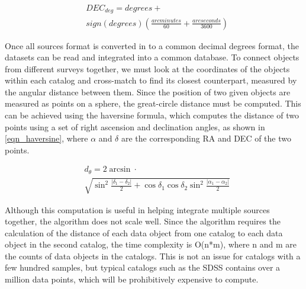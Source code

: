 \documentclass[11pt,sigconf]{acmart}
\begin{document}
\begin{equation} \label{eqn_dec}
  \begin{split}
  & DEC_{deg}= degrees+ \\
  & sign(degrees)(\frac{arcminutes}{60} + \frac{arcseconds}{3600})
  \end{split}
\end{equation}

Once all sources format is converted in to a common decimal degrees format, the 
datasets can be read and integrated into a common database. To connect objects 
from different surveys together, we must look at the coordinates of the
objects within each catalog and cross-match to find its closest counterpart, 
measured by the angular distance between them. Since the position of two given 
objects are measured as points on a sphere, the great-circle distance must be 
computed. This can be achieved using the haversine formula, which computes the 
distance of two points using a set of right ascension and declination angles, 
as shown in \ref{eqn_haversine}, where $\alpha$ and $\delta$ are the corresponding
RA and DEC of the two points.

\begin{equation} \label{eqn_haversine}
  \begin{split}
   & d_{\theta} = 2 \arcsin \cdot \\
   & {\sqrt{\sin^2\frac{\left| \delta_1 - \delta_2 \right|}{2} + \cos{\delta_1}\cos{\delta_2}\sin^2\frac{\left| \alpha_1 - \alpha_2 \right|}{2}}}  
  \end{split}
\end{equation}

Although this computation is useful in helping integrate multiple sources together, 
the algorithm does not scale well. Since the algorithm requires the calculation of
the distance of each data object from one catalog to each data object in the second
catalog, the time complexity is O(n*m), where n and m are the counts of data objects
in the catalogs. This is not an issue for catalogs with a few hundred samples,
but typical catalogs such as the SDSS contains over a million data points, which will
be prohibitively expensive to compute.
\end{document}
